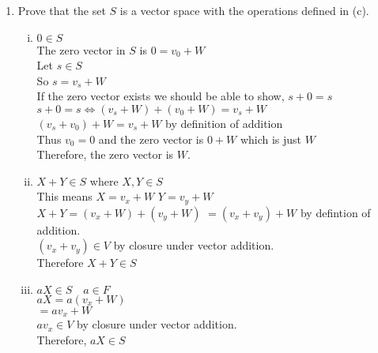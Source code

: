 \documentclass[11pt]{scrartcl}
\begin{document}
\begin{enumerate}[label=\alph*.]
{{\begin{proof}
\begin{enumerate}[i.]
{				
				}
				\item{	
				$a(v_1 + W) = a(v'_1 + W)$\\
				Let $q \in a(v_1 + W)$\\
				$q \in av_1 + W$ by definition of scalar multplication.\\
				So, $q = av_1 + w_q$ where $w_q \in W$\\
				$ = av_1 + w_q + av'_1 - av'_1$\\
				$ = av'_1 + w_q + av_1 - av'_1$\\
				$ = av'1 + a(v_1 - v'_1) + w_q$\\
				From b. i, $a(v_1 - v'_1) \in W$\\ 
				$a(v_1 - v'_1) + w_q \in W$ because closure under vector addition.\\
				So, $q \in av'_1 + W$\\
				So, $a(v_1 + W) \subseteq a(v'_1 + W)$\\
				Similarly, we can show $a(v'_1 + W) \subseteq a(v_1 + W)$\\
				Therefore, $a(v_1 + W)  = (v'_1 + W)$
				}
			\end{enumerate}
			\end{proof}
		}
	}	
\item{
		Prove that the set $S$ is a vector space with the operations defined in (c).	
	\begin{enumerate}[i.]
	\item{
		$0 \in S$\\
		The zero vector in $S$ is $ 0 = v_0 + W$\\
		Let $s \in S$\\
	    So $s = v_s + W$\\
		If the zero vector exists we should be able to show, $s + 0 = s$\\
		$s + 0 = s \Leftrightarrow (v_s + W) + (v_0 + W) = v_s + W$\\
		$(v_s + v_0) + W = v_s + W$ by definition of addition\\
		Thus $v_0 = 0$ and the zero vector is $0 + W$ which is just $W$\\
		Therefore, the zero vector is $W$.\\
		}
	\item{
		$X + Y \in S$ where $X,Y \in S$\\
	    This means $X = v_x + W$ \quad $Y = v_y + W$\\	
		$X + Y = (v_x + W) + (v_y + W)$
		$= (v_x + v_y) + W$ by defintion of addition.\\
		$(v_x + v_y) \in V$ by closure under vector addition.\\
		Therefore $X + Y \in S$\\
		}
	\item{
		$aX \in S \quad a \in F$\\
		$aX = a(v_x + W)$\\
		$= av_x + W$\\
		$av_x \in V$ by closure under vector addition.\\
		Therefore, $aX \in S$
		}
	\end{enumerate}
	}
\end{enumerate}
\end{document}
